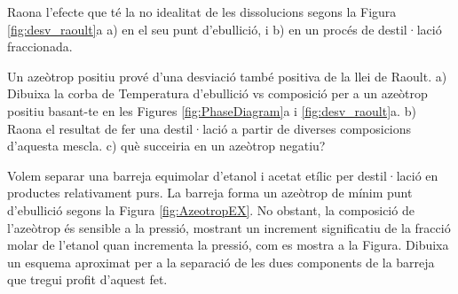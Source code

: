 \begin{exr}{}
Raona l'efecte que té la no idealitat de les dissolucions segons la Figura \ref{fig:desv_raoult}a a) en el seu punt d'ebullició, i b) en un procés de destil·lació fraccionada.
\end{exr}

\begin{exr}{}
    Un azeòtrop positiu prové d'una desviació també positiva de la llei de Raoult. a) Dibuixa la corba de Temperatura d'ebullició vs composició per a un azeòtrop positiu basant-te en les Figures \ref{fig:PhaseDiagram}a i \ref{fig:desv_raoult}a. b) Raona el resultat de fer una destil·lació a partir de diverses composicions d'aquesta mescla. c) què succeiria en un azeòtrop negatiu?
    \end{exr}
    \begin{exr}{}
        Volem separar una barreja equimolar d'etanol i acetat etílic per destil·lació en productes relativament purs. La barreja forma un azeòtrop de mínim punt d'ebullició segons la Figura \ref{fig:AzeotropEX}. No obstant, la composició de l'azeòtrop és sensible a la pressió, mostrant un increment significatiu de la fracció molar de l'etanol quan incrementa la pressió, com es mostra a la Figura. Dibuixa un esquema aproximat per a la separació de les dues components de la barreja que tregui profit d'aquest fet.
        \end{exr}
